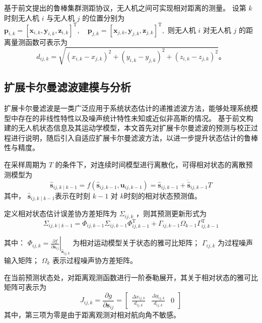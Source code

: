 基于前文提出的鲁棒集群测距协议，无人机之间可实现相对距离的测量。
设第  $k$  时刻无人机  $i$  与无人机  $j$  的位置分别为
$\boldsymbol{p}_{i, k}=\left[\boldsymbol{x}_{i, k}, \boldsymbol{y}_{i, k}, \boldsymbol{z}_{i, k}\right]^{\mathrm{T}}, \quad \boldsymbol{p}_{j, k}=\left[\boldsymbol{x}_{j, k}, \boldsymbol{y}_{j, k}, \boldsymbol{z}_{j, k}\right]^{\mathrm{T}},$
则无人机  $i$  对无人机  $j$  的距离量测函数可表示为
\begin{equation}
d_{i j, k}=\sqrt{\left(x_{i, k}-x_{j, k}\right)^{2}+\left(y_{i, k}-y_{j, k}\right)^{2}+\left(z_{i, k}-z_{j, k}\right)^{2}} \text{。}
\end{equation}

\subsection{扩展卡尔曼滤波建模与分析}
扩展卡尔曼滤波是一类广泛应用于系统状态估计的递推滤波方法，能够处理系统模型中存在的非线性特性以及噪声统计特性未知或近似非高斯的情况。
基于前文构建的无人机状态信息及其运动学模型，本文首先对扩展卡尔曼滤波的预测与校正过程进行说明，随后引入自适应扩展卡尔曼滤波方法，以进一步提升状态估计的鲁棒性与精度。

在采样周期为 $T$ 的条件下，对连续时间模型进行离散化，可得相对状态的离散预测模型为
\begin{equation}
\hat{\mathbf{s}}_{i j, k \mid k-1}=f\left(\hat{\mathbf{s}}_{i j, k-1}, \mathbf{u}_{i j, k-1}\right)=\hat{\mathbf{s}}_{i j, k-1}+\dot{\hat{\mathbf{s}}}_{i j, k-1} T
\end{equation}
其中， $\hat{\mathbf{s}}_{i j, k \mid k-1}$​ 表示在时刻 $ k-1$ 对 $k $时刻的相对状态预测值。

定义相对状态估计误差协方差矩阵为  $\Sigma_{i j, k}$  ，则其预测更新形式为
\begin{equation}
\Sigma_{i j, k \mid k-1}=\Phi_{i j, k-1} \Sigma_{i j, k-1} \Phi_{i j, k-1}^{\mathrm{T}}+\Gamma_{i j, k-1} \Omega_{k-1} \Gamma_{i j, k-1}^{\mathrm{T}}
\end{equation}

其中：
$\Phi_{i j, k}=\left.\frac{\partial f}{\partial \mathbf{s}_{i j}}\right|_{\hat{\mathbf{s}}_{i j, k}}$  为相对运动模型关于状态的雅可比矩阵；
$\Gamma_{i j, k}$  为过程噪声输入矩阵；
$\Omega_{k}$  表示过程噪声协方差矩阵。

在当前预测状态处，对距离观测函数进行一阶泰勒展开，其关于相对状态的雅可比矩阵可表示为
\begin{equation}
J_{i j, k}=\frac{\partial g}{\partial \mathbf{s}_{i j}}=\left[\begin{array}{ccc}
\frac{\Delta x_{i j, k}}{d_{i j, k}} & \frac{\Delta y_{i j, k}}{d_{i j, k}} & 0
\end{array}\right]
\end{equation}
其中，第三项为零是由于距离观测对相对航向角不敏感。

